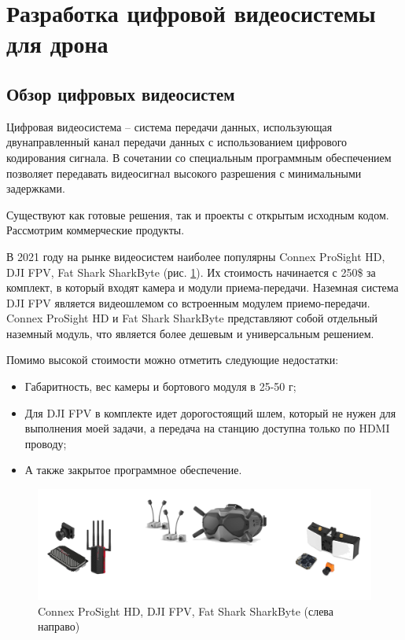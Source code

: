 
\section{Разработка цифровой видеосистемы для дрона}

\subsection{Обзор цифровых видеосистем}

Цифровая видеосистема -- система передачи данных, использующая двунаправленный канал передачи данных с использованием цифрового кодирования сигнала. В сочетании со специальным программным обеспечением позволяет передавать видеосигнал высокого разрешения с минимальными задержками.

Существуют как готовые решения, так и проекты с открытым исходным кодом. Рассмотрим коммерческие продукты.

В 2021 году на рынке видеосистем наиболее популярны Connex ProSight HD, DJI FPV, Fat Shark SharkByte \cite{oscar} (рис. \ref{fig:HD}).
Их стоимость начинается с 250\$ за комплект, в который входят камера и  модули приема-передачи. 
Наземная система DJI FPV является видеошлемом со встроенным модулем приемо-передачи. Connex ProSight HD и Fat Shark SharkByte представляют собой отдельный наземный модуль, что является более дешевым и универсальным решением.

Помимо высокой стоимости можно отметить следующие недостатки:
\begin{itemize}
	\item Габаритность, вес камеры и бортового модуля в 25-50 г;
	\item Для DJI FPV в комплекте идет дорогостоящий шлем, который не нужен для выполнения моей задачи, а передача на станцию доступна только по HDMI проводу;
	\item А также закрытое программное обеспечение. 
\end{itemize}

\begin{figure}[H]
	\centering
	\includegraphics[width=0.7\linewidth]{pics/buyHD}
	\caption{ Connex ProSight HD, DJI FPV, Fat Shark SharkByte (слева направо) 
	}
	\label{fig:HD}
\end{figure}

